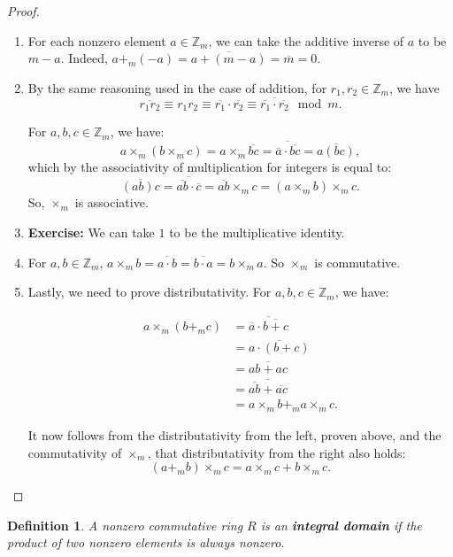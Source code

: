 \documentclass[a4paper,12pt]{report}
\newcommand{\ol}[1]{\overline{#1}}
\newcommand{\class}[2]{#2}
\newcounter{statement}
\numberwithin{statement}{chapter}
\newtheorem{defn}[statement]{Definition}
\numberwithin{equation}{chapter}
\numberwithin{section}{chapter}
\numberwithin{subsection}{section}
\begin{document}
\begin{proof}
\begin{enumerate}
\item 
For each nonzero element $a \in \mathbb{Z}_m$, we can take the additive inverse of $a$ to be $m - a$.
Indeed, $a +_m (-a)  = \overline{a + (m - a)} = \overline{m} = 0$.

\item 
By the same reasoning used in the case of addition,
for $r_1, r_2 \in \mathbb{Z}_m$, we have
\[
\ol{r_1 r_2} \equiv r_1r_2 \equiv \ol{r_1}\cdot\ol{r_2}
\equiv \ol{\ol{r_1}\cdot\ol{r_2}} \mod m.
\]



For $a, b, c \in \mathbb{Z}_m$, we have:
\[
a\times_m(b\times_mc) = a\times_m\overline{bc} = \ol{\ol{a}\cdot\ol{bc}} = \ol{a(bc)},
\]
which by the associativity of multiplication for integers is equal to:
\[
\ol{(ab) c} = \ol{\ol{ab}\cdot\ol{c}} = \ol{ab}\times_m c = (a\times_m b)\times_m c.
\]
So, $\times_m$ is associative.

\item 
 {\bf  Exercise:}  We can take $1$ to be the multiplicative identity.

\item 
For $a, b \in \mathbb{Z}_m$, $a\times_m b =\ol{a\cdot b} = \ol{b\cdot a} = b\times_ma$.  So $\times_m$ is commutative.

\item 
Lastly, we need to prove distributativity.
For $a, b, c \in \mathbb{Z}_m$, we have:

\[
\begin{split}
a \times_m (b +_m c) &= \ol{\ol{a} \cdot \ol{b + c}}
\\&
\class{steps9 steps}{= \ol{a \cdot (b + c)}}
\\&
\class{steps9 steps}{ = \ol{ab + ac}}
\\&
\class{steps9 steps}{ = \ol{\ol{ab} + \ol{ac}}}
\\&
\class{steps9 steps}{= a\times_m b +_m a\times_m c.}
\end{split}
\]


It now follows from the distributativity from the left, proven above,
and the commutativity of $\times_m$,
that distributativity from the right also holds:
\[
(a +_m b) \times_m c = a\times_m c + b\times_m c.
\]

\end{enumerate}


\end{proof}




\begin{defn}
A nonzero commutative ring $R$ is an  {\bf integral domain}  if
the product of two nonzero elements is always nonzero.
\end{defn}
\end{document}
